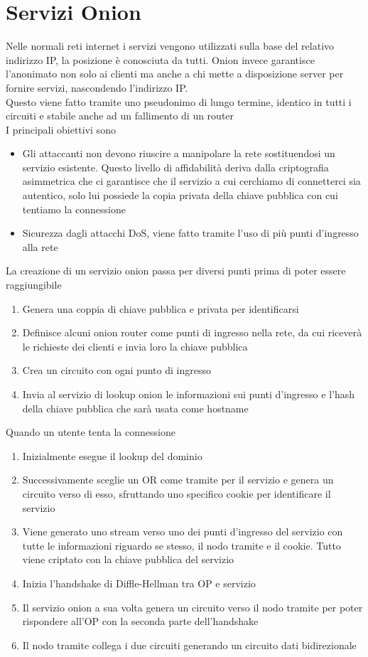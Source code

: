 \section{Servizi Onion}
Nelle normali reti internet i servizi vengono utilizzati sulla base del relativo indirizzo IP, la posizione è conosciuta da tutti. Onion invece garantisce l'anonimato non solo ai clienti ma anche a chi mette a disposizione server per fornire servizi, nascondendo l'indirizzo IP. \\
Questo viene fatto tramite uno pseudonimo di lungo termine, identico in tutti i circuiti e stabile anche ad un fallimento di un router \\
I principali obiettivi sono
\begin{itemize}
    \item Gli attaccanti non devono riuscire a manipolare la rete sostituendosi un servizio esistente. Questo livello di affidabilità deriva dalla criptografia asimmetrica che ci garantisce che il servizio a cui cerchiamo di connetterci sia autentico, solo lui possiede la copia privata della chiave pubblica con cui tentiamo la connessione
    \item Sicurezza dagli attacchi DoS, viene fatto tramite l'uso di più punti d'ingresso alla rete 
\end{itemize}
La creazione di un servizio onion passa per diversi punti prima di poter essere raggiungibile
\begin{enumerate}
    \item Genera una coppia di chiave pubblica e privata per identificarsi
    \item Definisce alcuni onion router come punti di ingresso nella rete, da cui riceverà le richieste dei clienti e invia loro la chiave pubblica
    \item Crea un circuito con ogni punto di ingresso
    \item Invia al servizio di lookup onion le informazioni sui punti d'ingresso e l'hash della chiave pubblica che sarà usata come hostname
\end{enumerate}
Quando un utente tenta la connessione
\begin{enumerate}
    \item Inizialmente esegue il lookup del dominio
    \item Successivamente sceglie un OR come tramite per il servizio e genera un circuito verso di esso, sfruttando uno specifico cookie per identificare il servizio
    \item Viene generato uno stream verso uno dei punti d'ingresso del servizio con tutte le informazioni riguardo se stesso, il nodo tramite e il cookie. Tutto viene criptato con la chiave pubblica del servizio
    \item Inizia l'handshake di Diffle-Hellman tra OP e servizio
    \item Il servizio onion a sua volta genera un circuito verso il nodo tramite per poter rispondere all'OP con la seconda parte dell'handshake
    \item Il nodo tramite collega i due circuiti generando un circuito dati bidirezionale 
\end{enumerate}
